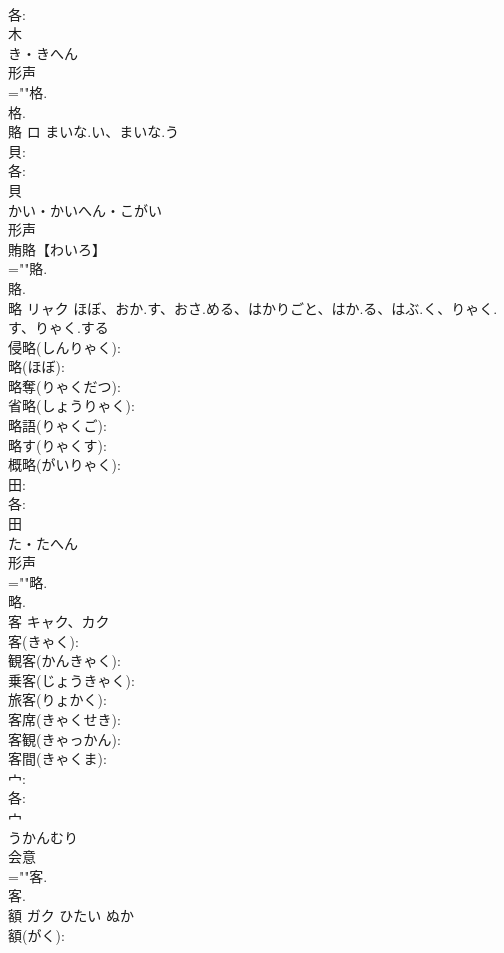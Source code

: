 \documentclass[8pt]{extreport}
\begin{document}
\begin{CJK}{UTF8}{min}
\\	各: 
\\	木	
\\	き・きへん	
\\	形声 
\\	=""格.
\\	格.
\\	賂	ロ	まいな.い、まいな.う		
\\	貝: 
\\	各: 
\\	貝	
\\	かい・かいへん・こがい	
\\	形声 
\\	賄賂【わいろ】 
\\	=""賂.
\\	賂.
\\	略	リャク	ほぼ、おか.す、おさ.める、はかりごと、はか.る、はぶ.く、りゃく.す、りゃく.する		
\\	侵略(しんりゃく): 
\\	略(ほぼ): 
\\	略奪(りゃくだつ): 
\\	省略(しょうりゃく): 
\\	略語(りゃくご): 
\\	略す(りゃくす): 
\\	概略(がいりゃく): 
\\	田: 
\\	各: 
\\	田	
\\	た・たへん	
\\	形声 
\\	=""略.
\\	略.
\\	客	キャク、カク			
\\	客(きゃく): 
\\	観客(かんきゃく): 
\\	乗客(じょうきゃく): 
\\	旅客(りょかく): 
\\	客席(きゃくせき): 
\\	客観(きゃっかん): 
\\	客間(きゃくま): 
\\	宀: 
\\	各: 
\\	宀	
\\	うかんむり	
\\	会意 
\\	=""客.
\\	客.
\\	額	ガク	ひたい	ぬか	
\\	額(がく): 

\end{CJK}
\end{document}
